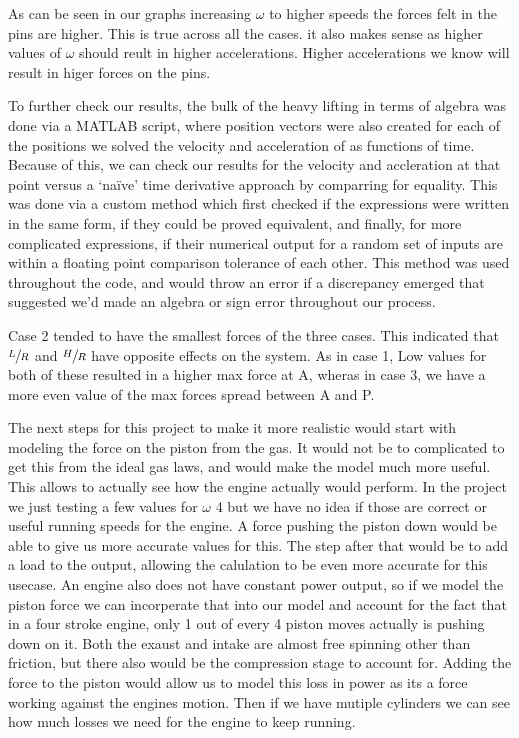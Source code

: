 \documentclass[nofoot,pdf-a,balance,colorlinks,upint,subscriptcorrection,varvw,mathalfa=cal=boondoxo]{asmeconf}
\begin{document}
	As can be seen in our graphs increasing $\omega$ to higher speeds the forces felt in the pins are higher. This is true across all the cases. it also makes sense as higher values of $\omega$ should reult in higher accelerations. Higher accelerations we know will result in higer forces on the pins.
    
    To further check our results, the bulk of the heavy lifting in terms of algebra was done via a MATLAB script, where position vectors were also created for each of the positions we solved the velocity and acceleration of as functions of time. Because of this, we can check our results for the velocity and accleration at that point versus a `naïve' time derivative approach by comparring for equality. This was done via a custom method which first checked if the expressions were written in the same form, if they could be proved equivalent, and finally, for more complicated expressions, if their numerical output for a random set of inputs are within a floating point comparison tolerance of each other. This method was used throughout the code, and would throw an error if a discrepancy emerged that suggested we'd made an algebra or sign error throughout our process.


	Case 2 tended to have the smallest forces of the three cases. This indicated that $\sfrac{L}{R}$ and $\sfrac{H}{R}$ have opposite effects on the system. As in case 1, Low values for both of these resulted in a higher max force at A, wheras in case 3, we have a more even value of the max forces spread between A and P.

	The next steps for this project to make it more realistic would start with modeling the force on the piston from the gas. It would not be to complicated to get this from the ideal gas laws, and would make the model much more useful. This allows to actually see how the engine actually would perform. In the project we just testing a few values for $\omega$ 4 but we have no idea if those are correct or useful running speeds for the engine. A force pushing the piston down would be able to give us more accurate values for this. The step after that would be to add a load to the output, allowing the calulation to be even more accurate for this usecase. An engine also does not have constant power output, so if we model the piston force we can incorperate that into our model and account for the fact that in a four stroke engine, only 1 out of every 4 piston moves actually is pushing down on it. Both the exaust and intake are almost free spinning other than friction, but there also would be the compression stage to account for. Adding the force to the piston would allow us to model this loss in power as its a force working against the engines motion. Then if we have mutiple cylinders we can see how much losses we need for the engine to keep running. 
\end{document}

